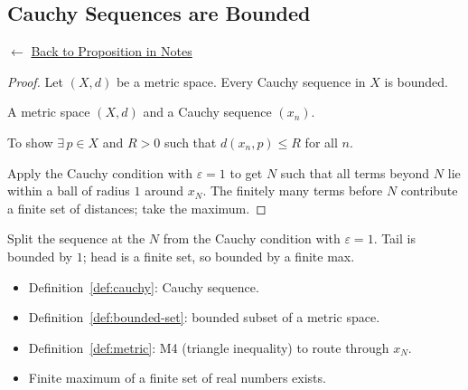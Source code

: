 
\subsection*{Cauchy Sequences are Bounded}
\label{prf:cauchy-bounded}

\begin{remark*}[Return]
$\leftarrow$ \hyperref[prop:cauchy-bounded]{Back to Proposition in Notes}
\end{remark*}

\begin{proof}
\Claim Let $(X,d)$ be a metric space.
Every Cauchy sequence in $X$ is bounded.

\Given A metric space $(X,d)$ and a Cauchy sequence $(x_n)$.

\Goal To show $\exists\, p \in X$ and $R > 0$ such that $d(x_n, p) \le R$ for all $n$.

\Strategy Apply the Cauchy condition with $\varepsilon = 1$ to get $N$ such
that all terms beyond $N$ lie within a ball of radius $1$ around $x_N$.
The finitely many terms before $N$ contribute a finite set of distances;
take the maximum.


\end{proof}

\begin{remark*}
Split the sequence at the $N$ from the Cauchy condition with $\varepsilon = 1$.
Tail is bounded by $1$; head is a finite set, so bounded by a finite max.
\end{remark*}

\begin{remark*}[Dependencies]
\begin{itemize}
  \item Definition~\ref{def:cauchy}: Cauchy sequence.
  \item Definition~\ref{def:bounded-set}: bounded subset of a metric space.
  \item Definition~\ref{def:metric}: M4 (triangle inequality) to route through $x_N$.
  \item Finite maximum of a finite set of real numbers exists.
\end{itemize}
\end{remark*}

